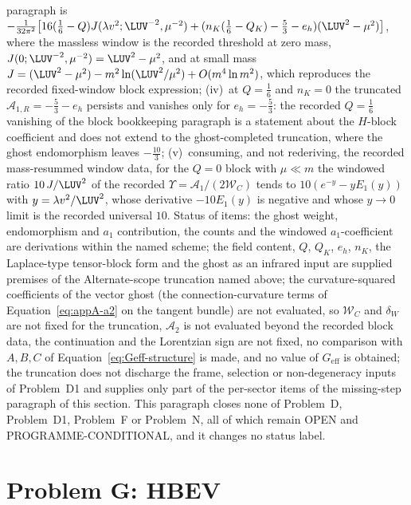 paragraph is \(-\frac{1}{32\pi^2}\bigl[16(\tfrac16-Q)J(\lambda v^2;\LUV^{-2},\mu^{-2})+(n_K(\tfrac16-Q_K)-\tfrac53-e_h)(\LUV^2-\mu^2)\bigr]\), where the massless window is the recorded threshold at zero mass, \(J(0;\LUV^{-2},\mu^{-2})=\LUV^2-\mu^2\), and at small mass \(J=(\LUV^2-\mu^2)-m^2\ln(\LUV^2/\mu^2)+O(m^4\ln m^2)\), which reproduces the recorded fixed-window block expression; (iv)~at \(Q=\tfrac16\) and \(n_K=0\) the truncated \(\mathcal A_{1,R}=-\tfrac53-e_h\) persists and vanishes only for \(e_h=-\tfrac53\): the recorded \(Q=\tfrac16\) vanishing of the block bookkeeping paragraph is a statement about the \(H\)-block coefficient and does not extend to the ghost-completed truncation, where the ghost endomorphism leaves \(-\tfrac{10}{3}\); (v)~consuming, and not rederiving, the recorded mass-resummed window data, for the \(Q=0\) block with \(\mu\ll m\) the windowed ratio \(10\,J/\LUV^2\) of the recorded \(\Upsilon=\mathcal A_1/(2\mathcal W_C)\) tends to \(10(e^{-y}-yE_1(y))\) with \(y=\lambda v^2/\LUV^2\), whose derivative \(-10E_1(y)\) is negative and whose \(y\to0\) limit is the recorded universal \(10\). Status of items: the ghost weight, endomorphism and \(a_1\) contribution, the counts and the windowed \(a_1\)-coefficient are derivations within the named scheme; the field content, \(Q\), \(Q_K\), \(e_h\), \(n_K\), the Laplace-type tensor-block form and the ghost as an infrared input are supplied premises of the Alternate-scope truncation named above; the curvature-squared coefficients of the vector ghost (the connection-curvature terms of Equation~\eqref{eq:appA-a2} on the tangent bundle) are not evaluated, so \(\mathcal W_C\) and \(\delta_W\) are not fixed for the truncation, \(\mathcal A_2\) is not evaluated beyond the recorded block data, the continuation and the Lorentzian sign are not fixed, no comparison with \(A,B,C\) of Equation~\eqref{eq:Geff-structure} is made, and no value of \(G_{\mathrm{eff}}\) is obtained; the truncation does not discharge the frame, selection or non-degeneracy inputs of Problem~D1 and supplies only part of the per-sector items of the missing-step paragraph of this section. This paragraph closes none of Problem~D, Problem~D1, Problem~F or Problem~N, all of which remain OPEN and PROGRAMME-CONDITIONAL, and it changes no status label.

\section{Problem G: HBEV}
\label{sec:status-G}

